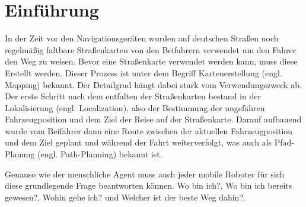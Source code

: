 \begin{comment}
------------------------------------------------------------------------------------------
- Lesen abholen und langsam an die Thematik heranführen.
- Sie soll gekonnt zum Thema hinführen und beim Leser ein Grundinteresse wecken.
- Es muss genau klar werden, welcher Erkenntnisgewinn von der Arbeit erwartet werden kann.
- Genauso müssen kurz die Ziele beschrieben werden, die man mit der Arbeit erreichen möchte, und welche Methoden dazu verwendet werden.
- Kann jemand nicht auf kleinem Raum deutlich machen, worüber er schreibt, aus welchem Grund und welche Ziele angestrebt werden, dann ist es nicht verwunderlich, dass sich das auch auf den Rest der Arbeit (negativ) auswirkt.
- Relevanz des Themas betonen
- Forschungsfrage vorstellen
- Erläutern der Vorgehensweise beim Beantworten der Forschungsfrage
- Erläuterung der Eingrenzung der Forschungsfrage
- Übersicht über Aufbau der Arbeit
- Unbedingt vermieden werden müssen persönliche Geständnisse und subjektive Meinungen: Dies gehört nie in eine Einleitung als Begründung für Themen- oder Methodikwahl und hat generell in wissenschaftlichen Arbeiten nichts zu suchen.
- Ferrein
	- Einleitung
	- allgemeine Einleitung in das Thema der Arbeit
	- Kurze Übersicht der Motivation und Problemstellung der Arbeit
	- Kurze Erläuterung des Lösungsansatzes
	- Überblick über die einzelnen Kapitel der Arbeit
\end{comment}
\chapter{Einführung}

In der Zeit vor den Navigationsgeräten wurden auf deutschen Straßen noch regelmäßig faltbare Straßenkarten von den Beifahrern verwendet um den Fahrer den Weg zu weisen. Bevor eine Straßenkarte verwendet werden kann, muss diese Erstellt werden. Dieser Prozess ist unter dem Begriff Kartenerstellung (engl. Mapping) bekannt. Der Detailgrad hängt dabei stark vom Verwendungszweck ab. Der erste Schritt nach dem entfalten der Straßenkarten bestand in der Lokalisierung (engl. Localization), also der Bestimmung der ungefähren Fahrzeugposition und dem Ziel der Reise auf der Straßenkarte. Darauf aufbauend wurde vom Beifahrer dann eine Route zwischen der aktuellen Fahrzeugposition und dem Ziel geplant und während der Fahrt weiterverfolgt, was auch als Pfad-Planung (engl. Path-Planning) bekannt ist.

Genauso wie der menschliche Agent muss auch jeder mobile Roboter für sich diese grundlegende Frage beantworten können. \glqq Wo bin ich?\grqq{}, \glqq Wo bin ich bereits gewesen?\grqq, \glqq Wohin gehe ich?\grqq{} und \glqq Welcher ist der beste Weg dahin?\grqq{}\cite{murphy2000introduction}.

